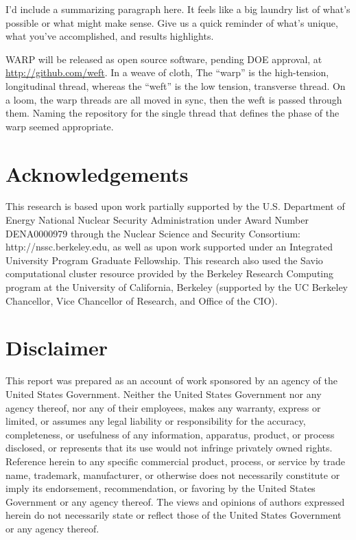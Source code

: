 \documentclass[preprint,12pt]{elsarticle}
\begin{document}
I'd include a summarizing paragraph here. It feels like a big laundry list of what's possible or what might make sense. Give us a quick reminder of what's unique, what you've accomplished, and results highlights. 

WARP will be released as open source software, pending DOE approval, at \url{http://github.com/weft}.  In a weave of cloth, The ``warp'' is the high-tension, longitudinal thread, whereas the ``weft'' is the low tension, transverse thread.  On a loom, the warp threads are all moved in sync, then the weft is passed through them.  Naming the repository for the single thread that defines the phase of the warp seemed appropriate.

\section*{Acknowledgements}
\label{sec:ack}

This research is based upon work partially supported by the U.S. Department of Energy National Nuclear Security Administration under Award Number DENA0000979 through the Nuclear Science and Security Consortium: http://nssc.berkeley.edu, as well as upon work supported under an Integrated University Program Graduate Fellowship.  This research also used the Savio computational cluster resource provided by the Berkeley Research Computing program at the University of California, Berkeley (supported by the UC Berkeley Chancellor, Vice Chancellor of Research, and Office of the CIO).

\section*{Disclaimer}
\label{sec:disc}

This report was prepared as an account of work sponsored by an agency of the United States Government. Neither the United States Government nor any agency thereof, nor any of their employees, makes any warranty, express or limited, or assumes any legal liability or responsibility for the accuracy, completeness, or usefulness of any information, apparatus, product, or process disclosed, or represents that its use would not infringe privately owned rights. Reference herein to any specific commercial product, process, or service by trade name, trademark, manufacturer, or otherwise does not necessarily constitute or imply its endorsement, recommendation, or favoring by the United States Government or any agency thereof. The views and opinions of authors expressed herein do not necessarily state or reflect those of the United States Government or any agency thereof.



\end{document}
